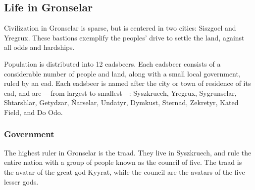 \begin{linenumbers}




\subsection*{Life in Gronselar}
Civilization in Gronselar is sparse, but is centered in two cities: Siszgoel and Yregrux.
These bastions exemplify the peoples' drive to settle the land, against all odds and hardships.

Population is distributed into 12 eadsbeers.
Each eadsbeer consists of a considerable number of people and land, along with a small local government, ruled by an ead.
Each eadsbeer is named after the city or town of residence of its ead, and are ---from largest to smallest---: Syszkruech, Yregrux, Sygrunselar, Shtarshlar, Getydzar, \~Narselar, Undatyr, Dymkust, Sternad, Zekretyr, Kated Field, and Do Odo.

\subsubsection{Government}
The highest ruler in Gronselar is the traad.
They live in Syszkruech, and rule the entire nation with a group of people known as the council of five.
The traad is the avatar of the great god Kyyrat, while the council are the avatars of the five lesser gods.


\end{linenumbers}
